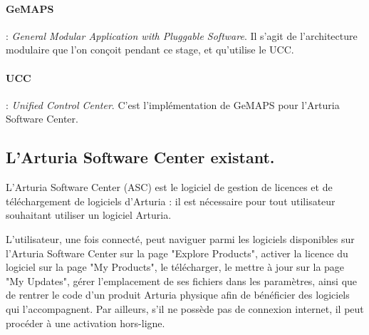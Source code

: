 \documentclass[francais]{rapportPFE}  %
\begin{document}
\paragraph{GeMAPS} : \textit{General Modular Application with Pluggable Software}. Il s'agit de l'architecture modulaire que l'on conçoit pendant ce stage, et qu'utilise le UCC.
\paragraph{UCC} : \textit{Unified Control Center}. C'est l'implémentation de GeMAPS pour l'Arturia Software Center.
\subsection{L'Arturia Software Center existant.}

L'Arturia Software Center \cite{asc}
 (ASC) est le logiciel de gestion de licences et de
téléchargement de logiciels d'Arturia : il est nécessaire pour tout utilisateur
souhaitant utiliser un logiciel Arturia. 

L'utilisateur, une fois connecté, peut naviguer parmi les logiciels disponibles sur l'Arturia Software Center sur la page "Explore Products", activer la licence du logiciel sur la page "My Products", le télécharger, le mettre à jour sur la page "My Updates", gérer l'emplacement de ses fichiers dans les paramètres, ainsi que de rentrer le code d'un produit Arturia physique afin de bénéficier des logiciels qui l'accompagnent.  Par ailleurs, s'il ne possède pas de connexion internet, il peut procéder à une activation hors-ligne.
\end{document}
